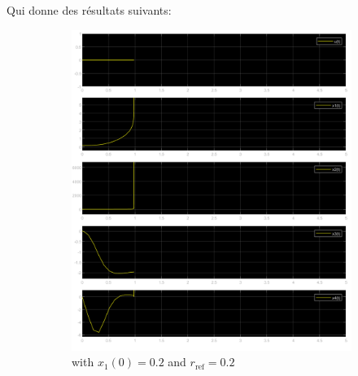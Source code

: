 \documentclass[class=article, crop=false]{standalone}
\begin{document}
\begin{resolution}
    Qui donne des résultats suivants:
    \begin{figure}[H]
        \centering
        \begin{subfigure}[b]{0.425\textwidth}
            \centering
            \includegraphics[width=\textwidth]{../images/simulink_scope20_02_02.png}
            \caption{with $x_1(0) = 0.2$ and $r_{\text{ref}} = 0.2$}
        \end{subfigure}
        \begin{subfigure}[b]{0.425\textwidth}
            \centering

\end{subfigure}
\end{figure}
\end{resolution}
\end{document}
